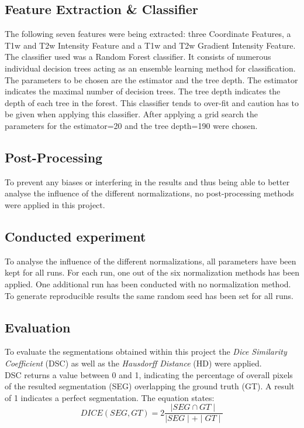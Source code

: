 \documentclass[journal]{IEEEtran}
\begin{document}
\subsection{Feature Extraction \& Classifier} 
	The following seven features were being extracted: three Coordinate Features, a T1w and T2w Intensity Feature and a T1w and T2w Gradient Intensity Feature.\\
	The classifier used was a Random Forest classifier. It consists of numerous individual decision trees acting as an ensemble learning method for classification.
	The parameters to be chosen are the estimator and the tree depth. The estimator indicates the maximal number of decision trees. 
	The tree depth indicates the depth of each tree in the forest.
	This classifier tends to over-fit and caution has to be given when applying this classifier.
	After applying a grid search the parameters for the estimator=20 and the tree depth=190 were chosen. 
	
	
\subsection{Post-Processing} 
	To prevent any biases or interfering in the results and thus being able to better analyse the influence of the different normalizations, no post-processing methods were applied in this project. 
	
	
\subsection{Conducted experiment}
	To analyse the influence of the different normalizations, all parameters have been kept for all runs. 
	For each run, one out of the six normalization methods has been applied. One additional run has been conducted with no normalization method.
	To generate reproducible results the same random seed has been set for all runs.  
	
\subsection{Evaluation}
	To evaluate the segmentations obtained within this project the {\itshape Dice Similarity Coefficient} (DSC) as well as the {\itshape Hausdorff Distance} (HD) were applied.\\
	DSC returns a value between 0 and 1, indicating the percentage of overall pixels of the resulted segmentation (SEG) overlapping the ground truth (GT). 
	A result of 1 indicates a perfect segmentation. The equation states: 
	\begin{equation}
		DICE(SEG, GT) = 2 \frac{\mid SEG \cap GT \mid}{\mid SEG \mid + \mid GT \mid}
	\end{equation}
\end{document}
